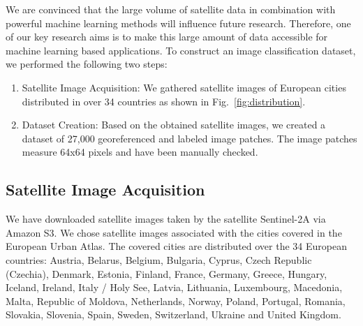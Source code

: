 \documentclass[journal]{IEEEtran}
\begin{document}


We are convinced that the large volume of satellite data in combination with powerful machine learning methods will influence future research. Therefore, one of our key research aims is to make this large amount of data accessible for machine learning based applications. To construct an image classification dataset, we performed the following two steps:


\begin{enumerate}
    \item Satellite Image Acquisition: We gathered satellite images of European cities distributed in over 34 countries as shown in Fig.~\ref{fig:distribution}.
    \item Dataset Creation: Based on the obtained satellite images, we created a dataset of 27,000 georeferenced and labeled image patches. The image patches measure 64x64 pixels and have been manually checked.
\end{enumerate}

\subsection{Satellite Image Acquisition}
  
We have downloaded satellite images taken by the satellite Sentinel-2A via Amazon S3. We chose satellite images associated with the cities covered in the European Urban Atlas. The covered cities are distributed over the 34 European countries: Austria, Belarus, Belgium, Bulgaria, Cyprus, Czech Republic (Czechia), Denmark, Estonia, Finland, France, Germany, Greece, Hungary, Iceland, Ireland, Italy / Holy See, Latvia, Lithuania, Luxembourg, Macedonia, Malta, Republic of Moldova, Netherlands, Norway, Poland, Portugal, Romania, Slovakia, Slovenia, Spain, Sweden, Switzerland, Ukraine and United Kingdom.
\end{document}
